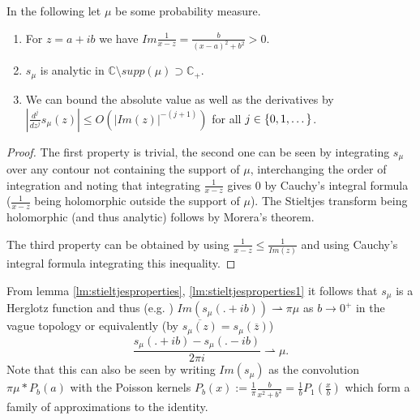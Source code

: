 \begin{lemma}\label{lm:stieltjesproperties}
In the following let $\mu$ be some probability measure.
	\begin{enumerate}
		\item For $z=a+ib$ we have $Im\frac{1}{x-z}=\frac{b}{(x-a)^2+b^2}>0$.\label{lm:stieltjesproperties1}
		\item $s_\mu$ is analytic in $\mathbb C\setminus supp(\mu)\supset\mathbb C_+$.\label{lm:stieltjesproperties2}
		\item We can bound the absolute value as well as the derivatives by $|\frac{d^j}{dz^j}s_\mu(z)|\leq O(|Im(z)|^{-(j+1)})$ for all $j\in\mathbb \{0,1,\dots\}$.\label{lm:stieltjesproperties3}
	\end{enumerate}
\end{lemma}

\begin{proof}
	The first property is trivial, the second one can be seen by integrating $s_\mu$ over any contour not containing the support of $\mu$, interchanging the order of integration and noting that integrating $\frac{1}{x-z}$ gives $0$ by Cauchy's integral formula ($\frac{1}{x-z}$ being holomorphic outside the support of $\mu$). The Stieltjes transform being holomorphic (and thus analytic) follows by Morera's theorem.
	
	The third property can be obtained by using $\frac{1}{x-z}\leq \frac{1}{Im(z)}$ and using Cauchy's integral formula integrating this inequality.
\end{proof}

\begin{corollary}
	From lemma \ref{lm:stieltjesproperties}, \ref{lm:stieltjesproperties1} it follows that $s_\mu$ is a Herglotz function and thus (e.g. \cite{TeschlQM}) $Im(s_\mu(.+ib))\rightharpoonup\pi\mu$ as $b\rightarrow 0^+$ in the vague topology or equivalently (by $\overline{s_\mu(z)}=s_\mu(\overline z)$)
	\begin{equation}
		\frac{s_\mu(.+ib)-s_\mu(.-ib)}{2\pi i}\rightharpoonup\mu.
	\end{equation}
	Note that this can also be seen by writing $Im(s_\mu)$ as the convolution $\pi\mu * P_b(a)$ with the Poisson kernels $P_b(x):=\frac{1}{\pi}\frac{b}{x^2+b^2} = \frac{1}{b}P_1(\frac{x}{b})$ which form a family of approximations to the identity.
\end{corollary}

